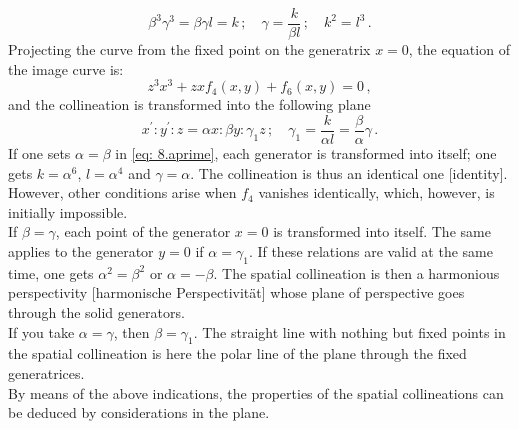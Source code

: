 \documentclass[leqno]{article}
\begin{document}
\begin{equation}\label{eq: 8.b}
\beta^3 \gamma^3 = \beta \gamma l = k \, ; \quad \gamma = \frac{k}{\beta l} \, ; \quad k^2 = l^3 \, . \tag{b} 
\end{equation}
Projecting the curve from the fixed point on the generatrix $x=0$, the equation of the image curve is: 
\[
z^3 x^3 + zx f_4(x, y) + f_6(x, y) = 0 \, , 
\] 
and the collineation is transformed into the following plane
\begin{equation}\label{eq: 8.a1prime}
x^\prime : y^\prime : z = \alpha x : \beta y : \gamma_1 z \, ; \quad \gamma_1 = \frac{k}{\alpha l} = \frac{\beta}{\alpha} \gamma \, . \tag{$a_1^\prime$}
\end{equation}
If one sets $\alpha=\beta$ in \eqref{eq: 8.aprime}, each generator is transformed into itself; one gets $k=\alpha^6$, $l=\alpha^4$ and $\gamma=\alpha$. The collineation is thus an identical one [identity]. However, other conditions arise when $f_4$ vanishes identically, which, however, is initially impossible. \\
If $\beta = \gamma$, each point of the generator $x=0$ is transformed into itself. The same applies to the generator $y=0$ if $\alpha = \gamma_1$. If these relations are valid at the same time, one gets $\alpha^2 = \beta^2$ or $\alpha=-\beta$. The spatial collineation is then a harmonious perspectivity [harmonische Perspectivit\"at] whose plane of perspective goes through the solid generators. \\
If you take $\alpha = \gamma$, then $\beta = \gamma_1$. The straight line with nothing but fixed points in the spatial collineation is here the polar line of the plane through the fixed generatrices. \\
By means of the above indications, the properties of the spatial collineations can be deduced by considerations in the plane.
\end{document}
